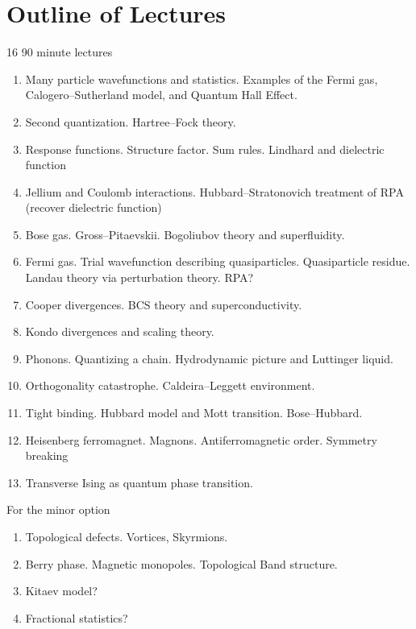 \section{Outline of Lectures}

16 90 minute lectures

\begin{enumerate}
\item Many particle wavefunctions and statistics. Examples of the Fermi gas, Calogero--Sutherland model, and Quantum Hall Effect.

\item Second quantization. Hartree--Fock theory.

\item Response functions. Structure factor. Sum rules. Lindhard and dielectric function

\item Jellium and Coulomb interactions. Hubbard--Stratonovich treatment of RPA (recover dielectric function)

\item Bose gas. Gross--Pitaevskii. Bogoliubov theory and superfluidity.

\item Fermi gas. Trial wavefunction describing quasiparticles. Quasiparticle residue. Landau theory via perturbation theory. RPA?

\item Cooper divergences. BCS theory and superconductivity. 

\item Kondo divergences and scaling theory.

\item Phonons. Quantizing a chain. Hydrodynamic picture and Luttinger liquid.

\item Orthogonality catastrophe. Caldeira--Leggett environment.

\item Tight binding. Hubbard model and Mott transition. Bose--Hubbard.

\item Heisenberg ferromagnet. Magnons. Antiferromagnetic order. Symmetry breaking


\item Transverse Ising as quantum phase transition.

\end{enumerate}

For the minor option

\begin{enumerate}

\item Topological defects. Vortices, Skyrmions. 

\item Berry phase. Magnetic monopoles. Topological Band structure.

\item Kitaev model?

\item Fractional statistics?
\end{enumerate}
